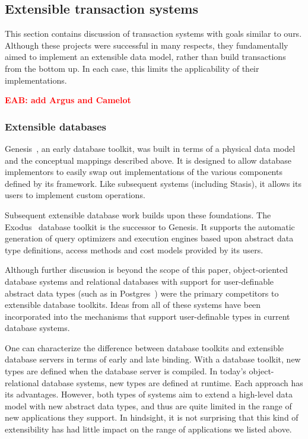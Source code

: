 \documentclass[letterpaper,twocolumn,10pt]{article}
\newcommand{\yad}{Stasis\xspace}
\newcommand{\eab}[1]{\textcolor{red}{\bf EAB: #1}}
\begin{document}
\subsection{Extensible transaction systems} 
\label{sec:otherDBs}
This section contains discussion of transaction systems with goals similar to ours.
Although these projects were
successful in many respects, they fundamentally aimed to implement an
extensible data model, rather than build transactions from the bottom up.
In each case, this limits the applicability of their implementations.

\eab{add Argus and Camelot}

\subsubsection{Extensible databases}

Genesis~\cite{genesis}, an early database toolkit, was built in terms
of a physical data model and the conceptual mappings described above.
It is designed to allow database implementors to easily swap out
implementations of the various components defined by its framework.
Like subsequent systems (including \yad), it allows its users to
implement custom operations.

Subsequent extensible database work builds upon these foundations.
The Exodus~\cite{exodus} database toolkit is the successor to
Genesis. It supports the automatic generation of query optimizers and
execution engines based upon abstract data type definitions, access
methods and cost models provided by its users.

Although further discussion is beyond the scope of this paper,
object-oriented database systems and relational databases with
support for user-definable abstract data types (such as in
Postgres~\cite{postgres}) were the primary competitors to extensible
database toolkits.  Ideas from all of these systems have been
incorporated into the mechanisms that support user-definable types in
current database systems.

One can characterize the difference between database toolkits and
extensible database servers in terms of early and late binding.  With
a database toolkit, new types are defined when the database server is
compiled.  In today's object-relational database systems, new types
are defined at runtime.  Each approach has its advantages.  However,
both types of systems aim to extend a high-level data model with new 
abstract data types, and thus are quite limited in the range of new 
applications they support.  In hindsight, it is not surprising that this kind of 
extensibility has had little impact on the range of applications 
we listed above.
\end{document}

